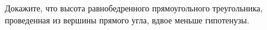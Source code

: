 \begin{ex}
	\begin{condition}
		Докажите, что высота равнобедренного прямоугольного треугольника, проведенная из вершины прямого угла, вдвое меньше гипотенузы.
	\end{condition}
\end{ex}